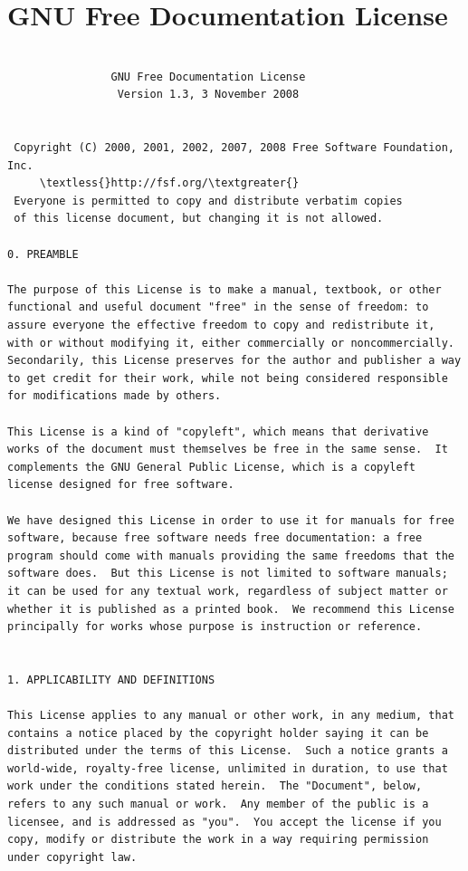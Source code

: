 \documentclass[letterpaper,10pt,english]{sphinxmanual}
\begin{document}
\chapter{GNU Free Documentation License}
\label{fdl::doc}\label{fdl:fdl}\label{fdl:gnu-free-documentation-license}
\begin{Verbatim}[commandchars=\\\{\}]

                GNU Free Documentation License
                 Version 1.3, 3 November 2008


 Copyright (C) 2000, 2001, 2002, 2007, 2008 Free Software Foundation, Inc.
     \textless{}http://fsf.org/\textgreater{}
 Everyone is permitted to copy and distribute verbatim copies
 of this license document, but changing it is not allowed.

0. PREAMBLE

The purpose of this License is to make a manual, textbook, or other
functional and useful document "free" in the sense of freedom: to
assure everyone the effective freedom to copy and redistribute it,
with or without modifying it, either commercially or noncommercially.
Secondarily, this License preserves for the author and publisher a way
to get credit for their work, while not being considered responsible
for modifications made by others.

This License is a kind of "copyleft", which means that derivative
works of the document must themselves be free in the same sense.  It
complements the GNU General Public License, which is a copyleft
license designed for free software.

We have designed this License in order to use it for manuals for free
software, because free software needs free documentation: a free
program should come with manuals providing the same freedoms that the
software does.  But this License is not limited to software manuals;
it can be used for any textual work, regardless of subject matter or
whether it is published as a printed book.  We recommend this License
principally for works whose purpose is instruction or reference.


1. APPLICABILITY AND DEFINITIONS

This License applies to any manual or other work, in any medium, that
contains a notice placed by the copyright holder saying it can be
distributed under the terms of this License.  Such a notice grants a
world-wide, royalty-free license, unlimited in duration, to use that
work under the conditions stated herein.  The "Document", below,
refers to any such manual or work.  Any member of the public is a
licensee, and is addressed as "you".  You accept the license if you
copy, modify or distribute the work in a way requiring permission
under copyright law.


\end{Verbatim}
\end{document}
